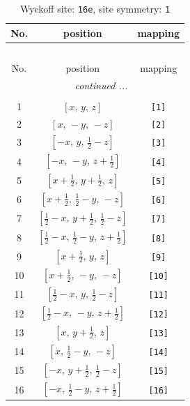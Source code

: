\documentclass[fleqn,8pt]{jsarticle}
\begin{document}
\begin{longtable}{ccc}
\caption{Wyckoff site: {\tt 16e}, site symmetry: {\tt 1}}
 \\
 \hline \hline
No. & position & mapping \\ \hline \endfirsthead

\multicolumn{2}{l}{\tablename\ \thetable{}} \\
 \hline \hline
No. & position & mapping \\ \hline \endhead

 \hline \hline
\multicolumn{2}{r}{\footnotesize\it continued ...} \\ \endfoot

 \hline \hline
\multicolumn{2}{r}{} \\ \endlastfoot

1 & $\left[ x,\, y,\, z \right]$ & {\tt [1]} \\ \hline
2 & $\left[ x,\, - y,\, - z \right]$ & {\tt [2]} \\ \hline
3 & $\left[ - x,\, y,\, \frac{1}{2} - z \right]$ & {\tt [3]} \\ \hline
4 & $\left[ - x,\, - y,\, z + \frac{1}{2} \right]$ & {\tt [4]} \\ \hline
5 & $\left[ x + \frac{1}{2},\, y + \frac{1}{2},\, z \right]$ & {\tt [5]} \\ \hline
6 & $\left[ x + \frac{1}{2},\, \frac{1}{2} - y,\, - z \right]$ & {\tt [6]} \\ \hline
7 & $\left[ \frac{1}{2} - x,\, y + \frac{1}{2},\, \frac{1}{2} - z \right]$ & {\tt [7]} \\ \hline
8 & $\left[ \frac{1}{2} - x,\, \frac{1}{2} - y,\, z + \frac{1}{2} \right]$ & {\tt [8]} \\ \hline
9 & $\left[ x + \frac{1}{2},\, y,\, z \right]$ & {\tt [9]} \\ \hline
10 & $\left[ x + \frac{1}{2},\, - y,\, - z \right]$ & {\tt [10]} \\ \hline
11 & $\left[ \frac{1}{2} - x,\, y,\, \frac{1}{2} - z \right]$ & {\tt [11]} \\ \hline
12 & $\left[ \frac{1}{2} - x,\, - y,\, z + \frac{1}{2} \right]$ & {\tt [12]} \\ \hline
13 & $\left[ x,\, y + \frac{1}{2},\, z \right]$ & {\tt [13]} \\ \hline
14 & $\left[ x,\, \frac{1}{2} - y,\, - z \right]$ & {\tt [14]} \\ \hline
15 & $\left[ - x,\, y + \frac{1}{2},\, \frac{1}{2} - z \right]$ & {\tt [15]} \\ \hline
16 & $\left[ - x,\, \frac{1}{2} - y,\, z + \frac{1}{2} \right]$ & {\tt [16]} \\
\end{longtable}
\end{document}
